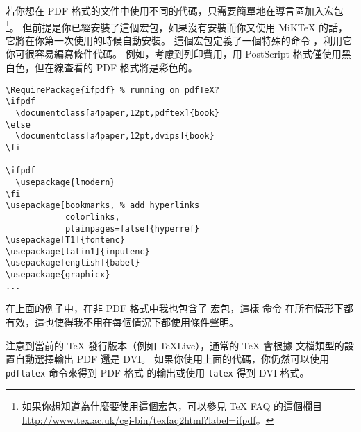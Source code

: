 若你想在 PDF 格式的文件中使用不同的代碼，只需要簡單地在導言區加入宏包 
\footnote{如果你想知道為什麼要使用這個宏包，可以參見 \TeX{} FAQ 的這個欄目\\
   \url{http://www.tex.ac.uk/cgi-bin/texfaq2html?label=ifpdf}。}。
但前提是你已經安裝了這個宏包，如果沒有安裝而你又使用 MiK\TeX{} 的話，
它將在你第一次使用的時候自動安裝。
這個宏包定義了一個特殊的命令 ，利用它你可很容易編寫條件代碼。
例如，考慮到列印費用，用 PostScript 
格式僅使用黑白色，但在線查看的 PDF 格式將是彩色的。

\begin{code}
\begin{verbatim}
\RequirePackage{ifpdf} % running on pdfTeX?
\ifpdf
  \documentclass[a4paper,12pt,pdftex]{book}
\else
  \documentclass[a4paper,12pt,dvips]{book}
\fi

\ifpdf
  \usepackage{lmodern}
\fi
\usepackage[bookmarks, % add hyperlinks
            colorlinks,
            plainpages=false]{hyperref}
\usepackage[T1]{fontenc}
\usepackage[latin1]{inputenc}
\usepackage[english]{babel}
\usepackage{graphicx}
...
\end{verbatim}
\end{code}


在上面的例子中，在非 PDF 格式中我也包含了  宏包，這樣  命令
在所有情形下都有效，這也使得我不用在每個情況下都使用條件聲明。


注意到當前的 \TeX{} 發行版本（例如 \TeX{}Live），通常的 \TeX{} 會根據
文檔類型的設置自動選擇輸出 PDF 還是 DVI。
如果你使用上面的代碼，你仍然可以使用 \verb|pdflatex| 命令來得到 PDF 格式
的輸出或使用 \verb|latex| 得到 DVI 格式。


